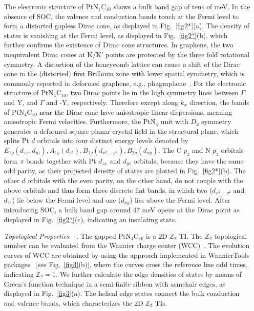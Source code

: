 \documentclass[aps,prl,twocolumn,showpacs,superscriptaddress]{revtex4-1}
\begin{document}
The electronic structure of PtN$_4$C$_{10}$ shows a bulk band gap of tens of meV. In the absence of SOC, the valence and conduction bands touch at the Fermi level to form a distorted gapless Dirac cone, as displayed in Fig.~\ref{fig2*}(a). The density of states is vanishing at the Fermi level, as displayed in Fig.~\ref{fig2*}(b), which further confirms the existence of Dirac cone structures. In graphene, the two inequivalent Dirac cones at K/K' points are protected by the three fold rotational symmetry. A distortion of the honeycomb lattice can cause a shift of the Dirac cone in the (distorted) first Brillouin zone with lower spatial symmetry, which is commonly reported in deformed graphene, e.g., phagraphene~\cite{ref53}. For the electronic structure of PtN$_4$C$_{10}$, two Dirac points lie in the high symmetry lines between $\Gamma$ and Y, and $\Gamma$ and -Y, respectively. Therefore except along $k_x$ direction, the bands of PtN$_4$C$_{10}$ near the Dirac cone have anisotropic linear dispersions, meaning anisotropic Fermi velocities. Furthermore, the PtN$_4$ unit with $D_2$ symmetry generates a deformed square planar crystal field in the structural plane, which splits Pt $d$ orbitals into four distinct energy levels denoted by $E_{1g} (d_{zx}, d_{yz}), A_{1g} (d_{z^2}), B_{1g} (d_{x^2-y^2}), B_{2g} (d_{xy})$. The C $p_z$ and N $p_z$ orbitals form $\pi$ bonds together with Pt $d_{zx}$ and $d_{yz}$ orbitals, because they have the same odd parity, as their projected density of states are plotted in Fig.~\ref{fig2*}(b). The other $d$ orbitals with the even parity, on the other hand, do not couple with the above orbitals and thus form three discrete flat bands, in which two ($d_{x^2-y^2}$ and $d_{z^2}$) lie below the Fermi level and one ($d_{xy}$) lies above the Fermi level. After introducing SOC, a bulk band gap around 47 meV opens at the Dirac point as displayed in Fig.~\ref{fig2*}(c), indicating an insulating state.


\textit{Topological Properties---.} The gapped PtN$_4$C$_{10}$ is a 2D $\mathbb{Z}_2$ TI. The $\mathbb{Z}_2$ topological number can be evaluated from the Wannier charge center (WCC)~\cite {ref50,ref51}. The evolution curves of WCC are obtained by using the approach implemented in WannierTools packages~\cite {ref43} [see Fig.~\ref{fig3}(b)], where the curves cross the reference line odd times, indicating $\mathbb{Z}_2=1$. We further calculate the edge densities of states by means of Green's function technique in a semi-finite ribbon with armchair edges, as displayed in Fig.~\ref{fig3}(a). The helical edge states connect the bulk conduction and valence bands, which characterizes the 2D $\mathbb{Z}_2$ TIs.
\end{document}
